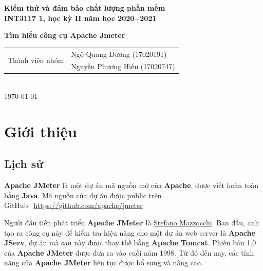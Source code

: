 \documentclass[10pt]{report}
\newcommand{\jmeter}{\textbf{Apache JMeter}}
\newcommand{\apache}{\textbf{Apache}}
\newcommand{\java}{\textbf{Java}}
\begin{document}
\begin{titlepage}

    \begin{center}
        \vfill
        {\LARGE\bf Kiểm thử và đảm bảo chất lượng phần mềm} \\
        {\Large\bf INT3117 1, học kỳ II năm học 2020$-$2021} \\
        \bigskip
        \bigskip

        \bigskip
        {\Huge\bf Tìm hiểu công cụ Apache Jmeter}
        \bigskip

        \bigskip
        \bigskip

        \begin{tabular}{c|l}
            \multirow{2}{*}{Thành viên nhóm} & Ngô Quang Dương (17020191) \\
            & Nguyễn Phương Hiếu (17020747) \\
        \end{tabular} \\
        \medskip
        {\today}
        \vfill
    \end{center}
\end{titlepage}

\tableofcontents

\chapter{Giới thiệu}

\section{Lịch sử}

\par \jmeter{} là một dự án mã nguồn mở của \apache{}, được viết hoàn toàn bằng \java{}. Mã nguồn của dự án được public trên GitHub:~\url{https://github.com/apache/jmeter}

\par Người đầu tiên phát triển \jmeter{} là \href{https://www.linkedin.com/in/stefanom}{Stefano Mazzocchi}. Ban đầu, anh tạo ra công cụ này để kiểm tra hiệu năng cho một dự án web server là \textbf{Apache JServ}, dự án mà sau này được thay thế bằng \textbf{Apache Tomcat}. Phiên bản 1.0 của \jmeter{} được đưa ra vào cuối năm 1998. Từ đó đến nay, các tính năng của \jmeter{} liên tục được bổ sung và nâng cao.
\end{document}
